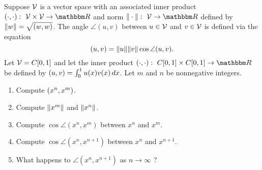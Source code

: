 Suppose ${\cal V}$ is a vector space with an associated inner product $\ip{\cdot,\cdot}:\mbox{ }\CV\times\CV\rightarrow\R$ and norm $\norm{\cdot}:\mbox{ }\CV\rightarrow\R$ defined by $\|w\|=\sqrt{(w,w) }$. The angle $\angle(u,v)$ between $u \in {\cal V}$ and $v \in {\cal V}$ is defined via the equation
\[ (u,v) = \|u\| \|v\| \cos \angle(u,v).\]
Let ${\cal V}=C[0,1]$ and let the inner product $\ip{\cdot,\cdot}:\mbox{ }C[0,1]\times C[0,1]\rightarrow\R$ be defined by $(u,v) = \int_0^1 u(x) v(x)\, dx$. Let $m$ and $n$ be nonnegative integers.
\begin{enumerate}
\item Compute $(x^n,x^m)$.
\\
\item Compute $\|x^m\|$ and $\|x^n\|$.
\\
\item Compute $\cos \angle(x^n,x^m)$ between $x^n$ and $x^m$.
\\
\item Compute $\cos \angle(x^n,x^{n+1})$ between $x^n$ and $x^{n+1}$.
\\
\item What happens to $\angle(x^n,x^{n+1})$ as $n\to\infty$ ?
\end{enumerate}


